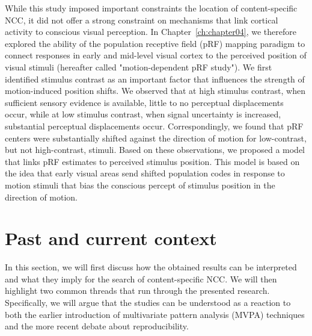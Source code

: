 While this study imposed important constraints the location of content-specific NCC, it did not offer a strong constraint on mechanisms that link cortical activity to conscious visual perception. In Chapter~\ref{ch:chapter04}, we therefore explored the ability of the population receptive field (pRF) mapping paradigm to connect responses in early and mid-level visual cortex to the perceived position of visual stimuli (hereafter called "motion-dependent pRF study"). We first identified stimulus contrast as an important factor that influences the strength of motion-induced position shifts. We observed that at high stimulus contrast, when sufficient sensory evidence is available, little to no perceptual displacements occur, while at low stimulus contrast, when signal uncertainty is increased, substantial perceptual displacements occur. Correspondingly, we found that pRF centers were substantially shifted against the direction of motion for low-contrast, but not high-contrast, stimuli. Based on these observations, we proposed a model that links pRF estimates to perceived stimulus position. This model is based on the idea that early visual areas send shifted population codes in response to motion stimuli that bias the conscious percept of stimulus position in the direction of motion.

\section{Past and current context}
In this section, we will first discuss how the obtained results can be interpreted and what they imply for the search of content-specific NCC. We will then highlight two common threads that run through the presented research. Specifically, we will argue that the studies can be understood as a reaction to both the earlier introduction of multivariate pattern analysis (MVPA) techniques and the more recent debate about reproducibility.

